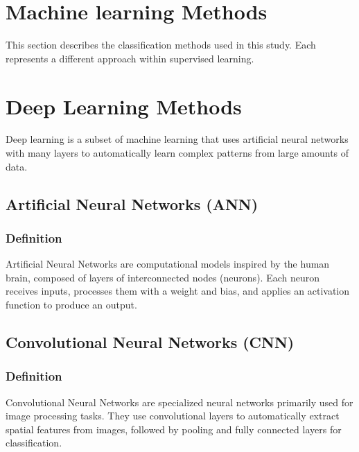 \section{Machine learning Methods}
This section describes the classification methods used in this study. Each represents a different approach within supervised learning.













\section{Deep Learning Methods}
Deep learning is a subset of machine learning that uses artificial neural networks with many layers to automatically learn complex patterns from large amounts of data.

\subsection{Artificial Neural Networks (ANN)}
\subsubsection{Definition}
Artificial Neural Networks are computational models inspired by the human brain, composed of layers of interconnected nodes (neurons). Each neuron receives inputs, processes them with a weight and bias, and applies an activation function to produce an output.

\subsection{Convolutional Neural Networks (CNN)}
\subsubsection{Definition}
Convolutional Neural Networks are specialized neural networks primarily used for image processing tasks. They use convolutional layers to automatically extract spatial features from images, followed by pooling and fully connected layers for classification.

